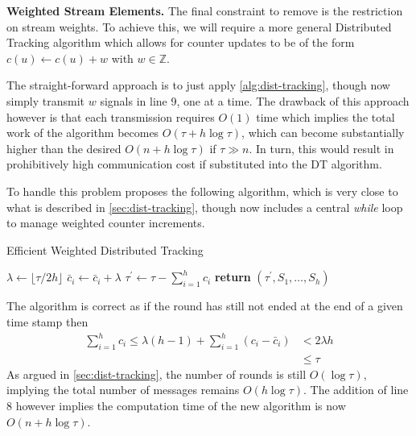 \textbf{Weighted Stream Elements.} The final constraint to remove is the restriction on stream weights. To achieve this, we will require a more general Distributed Tracking algorithm which allows for counter updates to be of the form $c(u) \gets c(u) + w$ with $w\in\mathbb{Z}$. 

The straight-forward approach is to just apply \cref{alg:dist-tracking}, though now simply transmit $w$ signals in line 9, one at a time. The drawback of this approach however is that each transmission requires $O(1)$ time which implies the total work of the algorithm becomes $O(\tau + h\log\tau)$, which can become substantially higher than the desired $O(n + h\log\tau)$ if $\tau\gg n$. In turn, this would result in prohibitively high communication cost if substituted into the DT algorithm. 

To handle this problem \cite{GAN16} proposes the following algorithm, which is very close to what is described in \cref{sec:dist-tracking}, though now includes a central \textit{while} loop to manage weighted counter increments. 

\begin{algorithm}
\caption{Efficient Weighted Distributed Tracking}\label{alg:weighted-dist-tracking}
\begin{algorithmic}[1]
    \State {}
\EndIf
\State {} $\lambda \leftarrow \lfloor \tau/2h\rfloor$
\State {}
    \State {}
    \State $\bar{c}_i\gets\bar{c}_i+\lambda$
        \State $\tau^\prime \gets \tau - \sum_{i=1}^{h}c_i$
        \State \textbf{return} $(\tau^\prime, S_1,\dots,S_h)$ 
\EndProcedure
\end{algorithmic}
\end{algorithm}

The algorithm is correct as if the round has still not ended at the end of a given time stamp then
\begin{align*}
    \sum_{i=1}^{h}c_i\leq \lambda(h-1) + \sum_{i=1}^{h}(c_i - \bar{c}_i) 
    &<2\lambda h \\
    &\leq\tau
\end{align*}
As argued in \cref{sec:dist-tracking}, the number of rounds is still $O(\log\tau)$, implying the total number of messages remains $O(h\log\tau)$. The addition of line 8 however implies the computation time of the new algorithm is now $O(n + h\log\tau)$.

